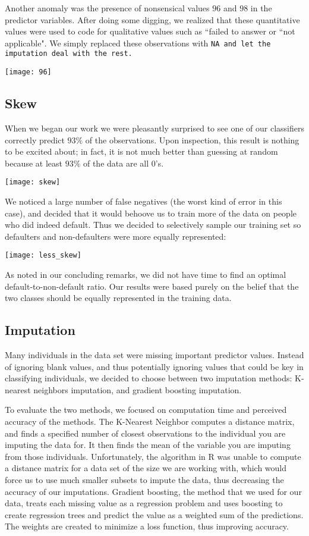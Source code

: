 \documentclass[11pt, oneside]{article}   	%
\begin{document}
	
	Another anomaly was the presence of nonsensical values $96$ and $98$ 
	in the predictor variables. After doing some digging, we realized that 
	these quantitative values were used to code for qualitative values such as 
	``failed to answer or ``not applicable". We simply replaced these observations with
	\tt NA\rm~and let the imputation deal with the rest.
	\begin{center}
	\texttt{[image: 96]}
	\end{center}
	
	
	\subsection{Skew}
	When we began our work we were pleasantly surprised to see
	one of our classifiers correctly predict $93\%$ of the observations. Upon inspection,
	this result is nothing to be excited about; in fact, it is not much better than guessing at 
	random because at least $93\%$ of the data are all $0$'s.
	\begin{center}
	\texttt{[image: skew]}
	\end{center}  
	We noticed a large number of false negatives (the worst kind of error in this case), and decided that it would behoove us to train more of the data on people who did indeed default. Thus we decided to selectively
	sample our training set so defaulters and non-defaulters were more equally represented:
	\begin{center}
	\texttt{[image: less\_skew]}
	\end{center}
	As noted in our concluding remarks, we did not have time to find an optimal default-to-non-default
	ratio. Our results were based purely on the belief that the two classes should be equally
	represented in the training data.
	
 	\subsection{Imputation}
	Many individuals in the data set were missing important predictor values. 
	Instead of ignoring blank values, and thus potentially ignoring values that could be key in 
	classifying individuals, we decided to choose between two imputation methods: K-nearest 
	neighbors imputation, and gradient boosting imputation. 
	
	To evaluate the two methods, we 
	focused on computation time and perceived accuracy of the methods. The K-Nearest Neighbor 
	computes a distance matrix, and finds a specified number of closest observations to the 
	individual you are imputing the data for. It then finds the mean of the variable you are imputing 
	from those individuals. Unfortunately, the algorithm in R was unable to compute a distance
	matrix for a data set of the size we are working with, which would force us to use much smaller
	subsets to impute the data, thus decreasing the accuracy of our imputations. Gradient
	boosting, the method that we used for our data, treats each missing value as a regression
	problem and uses boosting to create regression trees and predict the value as a weighted
	sum of the predictions. The weights are created to minimize a loss function, thus improving
	accuracy. 
	
\end{document}
